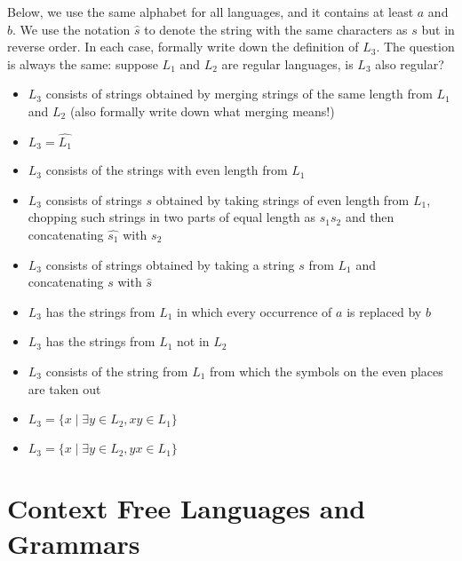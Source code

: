 \begin{exercise}
Below, we use the same alphabet for all languages, and it contains at
least $a$ and $b$.  We use the notation $\hat{s}$ to denote the string
with the same characters as $s$ but in reverse order. In each case,
formally write down the definition of $L_3$. The question is always the
same: suppose $L_1$ and $L_2$ are regular languages, is $L_3$ also regular?
\begin{itemize}
\item $L_3$ consists of strings obtained by merging strings of the same length
from $L_1$ and $L_2$ (also formally write down what merging means!)

\item $L_3 = \widehat{L_1}$

\item $L_3$ consists of the strings with even length from $L_1$

\item $L_3$ consists of strings $s$ obtained by taking strings of even length
from $L_1$, chopping such strings in two parts of equal length
as $s_1s_2$ and then concatenating $\widehat{s_1}$ with $s_2$

\item $L_3$ consists of strings obtained by taking a string $s$ from $L_1$ and
concatenating $s$ with $\hat{s}$

\item $L_3$ has the strings from $L_1$ in which every occurrence of $a$ is
replaced by $b$

\item $L_3$ has the strings from $L_1$ not in $L_2$

\item $L_3$ consists of the string from $L_1$ from which the symbols on the even
places are taken out

\item $L_3 = \{x\mid \exists y \in L_2, xy \in L_1\}$

\item $L_3 = \{x\mid \exists y \in L_2, yx \in L_1\}$

\end{itemize}
\end{exercise}



\chapter{Context Free Languages and Grammars}\label{contextvrijelanguages}

